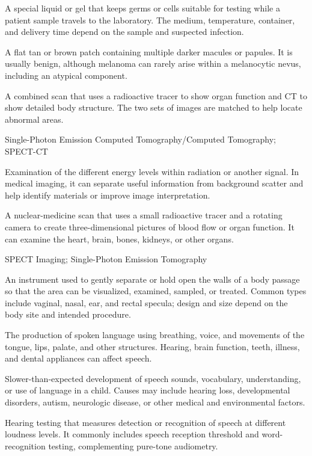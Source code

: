  A special liquid or gel that keeps germs or cells suitable for testing while a patient sample travels to the laboratory. The medium, temperature, container, and delivery time depend on the sample and suspected infection.

 A flat tan or brown patch containing multiple darker macules or papules. It is usually benign, although melanoma can rarely arise within a melanocytic nevus, including an atypical component.

 A combined scan that uses a radioactive tracer to show organ function and CT to show detailed body structure. The two sets of images are matched to help locate abnormal areas.

\synonyms
Single-Photon Emission Computed Tomography/Computed Tomography; SPECT-CT

 Examination of the different energy levels within radiation or another signal. In medical imaging, it can separate useful information from background scatter and help identify materials or improve image interpretation.

 A nuclear-medicine scan that uses a small radioactive tracer and a rotating camera to create three-dimensional pictures of blood flow or organ function. It can examine the heart, brain, bones, kidneys, or other organs.

\synonyms
SPECT Imaging; Single-Photon Emission Tomography

 An instrument used to gently separate or hold open the walls of a body passage so that the area can be visualized, examined, sampled, or treated. Common types include vaginal, nasal, ear, and rectal specula; design and size depend on the body site and intended procedure.

 The production of spoken language using breathing, voice, and movements of the tongue, lips, palate, and other structures. Hearing, brain function, teeth, illness, and dental appliances can affect speech.

 Slower-than-expected development of speech sounds, vocabulary, understanding, or use of language in a child. Causes may include hearing loss, developmental disorders, autism, neurologic disease, or other medical and environmental factors.

 Hearing testing that measures detection or recognition of speech at different loudness levels. It commonly includes
speech reception threshold and word-recognition testing, complementing pure-tone audiometry.

